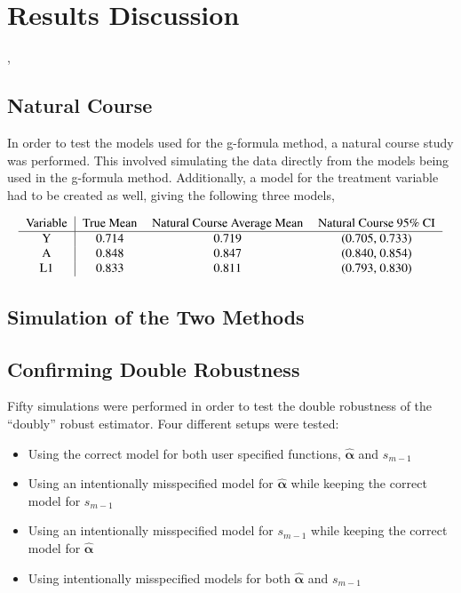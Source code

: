 
\chapter{Results Discussion}

, 

\section{Natural Course} 
In order to test the models used for the g-formula method, a natural course study was performed.  This involved simulating the data directly from the models being used in the g-formula method.  Additionally, a model for the treatment variable had to be created as well, giving the following three models, 

\begin{align} 
\begin{tabular}{c | c c c} 
Variable & True Mean & Natural Course Average Mean & Natural Course 95\% CI \\ 
\hline 
Y & 0.714 & 0.719 & (0.705, 0.733) \\
A & 0.848 & 0.847 & (0.840, 0.854) \\
L1 & 0.833 & 0.811 & (0.793, 0.830) \\
\end{tabular} 
\end{align} 

\section{Simulation of the Two Methods} 



\section{Confirming Double Robustness} 
Fifty simulations were performed in order to test the double robustness of the ``doubly'' robust estimator.  Four different setups were tested: 
\begin{itemize} 
\item Using the correct model for both user specified functions, $\hat{\mathbf{\alpha}}$ and $s_{m-1}$ 
\item Using an intentionally misspecified model for $\hat{\mathbf{\alpha}}$ while keeping the correct model for $s_{m-1}$ 
\item Using an intentionally misspecified model for $s_{m-1}$ while keeping the correct model for $\hat{\mathbf{\alpha}}$
\item Using intentionally misspecified models for both $\hat{\mathbf{\alpha}}$ and $s_{m-1}$ 
\end{itemize} 

